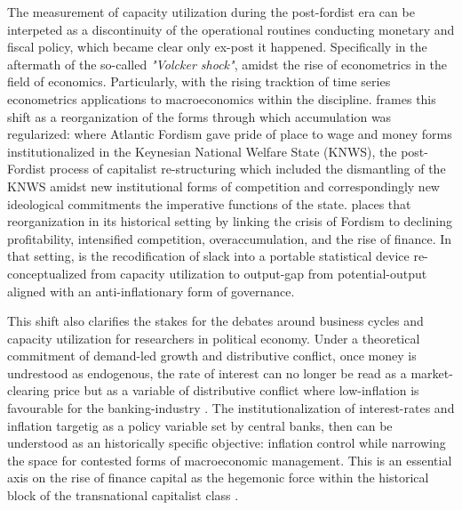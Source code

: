 \documentclass[11pt,a4paper]{article}
\begin{document}
The measurement of capacity utilization during the post-fordist era can be interpeted as a discontinuity of the operational routines conducting monetary and fiscal policy, which became clear only ex-post it happened. Specifically in the aftermath of the so-called \textit{"Volcker shock"}, amidst  the rise of econometrics in the field of economics. Particularly, with the rising tracktion of time series econometrics applications to macroeconomics  within the discipline. \citet{Jessop2002} frames this shift as a reorganization of the forms through which accumulation was regularized: where Atlantic Fordism gave pride of place to wage and money forms institutionalized in the Keynesian National Welfare State (KNWS), the  post-Fordist process of capitalist re-structuring which included the dismantling of the KNWS amidst new institutional forms of competition and correspondingly new ideological commitments the imperative functions of the state. \citet{Vidal2013} places that reorganization in its historical setting by linking the crisis of Fordism to declining profitability, intensified competition, overaccumulation, and the rise of finance. In that setting, is the recodification of slack into a portable statistical device re-conceptualized from capacity utilization to output-gap from  potential-output aligned with an anti-inflationary form of governance.

This shift also clarifies the stakes for the debates around business cycles and capacity utilization for researchers in political economy. Under a theoretical commitment of demand-led growth and distributive conflict, once money is undrestood as endogenous, the rate of interest can no longer be read as a market-clearing price but as a variable of distributive conflict where low-inflation is favourable for the banking-industry \citep{RochonSetterfield2008,LofaroMatamorosRochon2025}. The institutionalization of interest-rates and inflation targetig as a policy variable set by central banks, then can be understood as an historically specific objective: inflation control while narrowing the space for contested forms of macroeconomic management. This is an essential axis on the rise of finance capital as the hegemonic force within the historical block of the transnational capitalist class \citep{Robinson2000}. 
\end{document}
